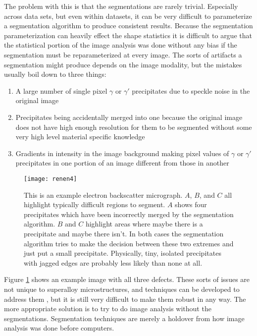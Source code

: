 \documentclass[review]{elsarticle}
\begin{document}
	The problem with this is that the segmentations are rarely trivial. Especially across data sets, but even within datasets, it can be very difficult to parameterize a segmentation algorithm to produce consistent results. Because the segmentation parameterization can heavily effect the shape statistics it is difficult to argue that the statistical portion of the image analysis was done without any bias if the segmentation must be reparameterized at every image. The sorts of artifacts a segmentation might produce depends on the image modality, but the mistakes usually boil down to three things:

	\begin{enumerate}
		\item \label{prob1} A large number of single pixel $\gamma$ or $\gamma'$ precipitates due to speckle noise in the original image
		\item Precipitates being accidentally merged into one because the original image does not have high enough resolution for them to be segmented without some very high level material specific knowledge
		\item Gradients in intensity in the image background making pixel values of $\gamma$ or $\gamma'$ precipitates in one portion of an image different from those in another
	\end{enumerate}
	
	\begin{figure}[!ht]
  		\centering
    	\texttt{[image: renen4]}
  		\caption{This is an example electron backscatter micrograph. $A$, $B$, and $C$ all highlight typically difficult regions to segment. $A$ shows four precipitates which have been incorrectly merged by the segmentation algorithm. $B$ and $C$ highlight areas where maybe there is a precipitate and maybe there isn't. In both cases the segmentation algorithm tries to make the decision between these two extremes and just put a small precipitate. Physically, tiny, isolated precipitates with jagged edges are probably less likely than none at all. }
  		\label{figure1}
	\end{figure}

	Figure \ref{figure1} shows an example image with all three defects. These sorts of issues are not unique to superalloy microstructures, and techniques can be developed to address them \cite{comer, marc1, marc2, marc3}, but it is still very difficult to make them robust in any way. The more appropriate solution is to try to do image analysis without the segmentations. Segmentation techniques are merely a holdover from how image analysis was done before computers.
\end{document}
